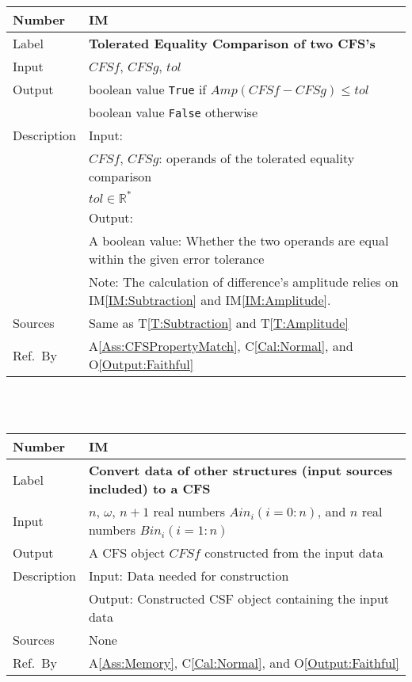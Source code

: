 \documentclass[12pt]{article}
\newcommand{\colAwidth}{0.13\textwidth}
\newcommand{\colBwidth}{0.82\textwidth}
\newcommand{\tref}[1]{T\ref{#1}}
\newcommand{\aref}[1]{A\ref{#1}}
\newcommand{\calref}[1]{C\ref{#1}}
\newcommand{\oref}[1]{O\ref{#1}}
\newcounter{instnum} %
\newcommand{\iref}[1]{IM\ref{#1}}
\begin{document}
\noindent
\begin{minipage}{\textwidth}
       	\renewcommand*{\arraystretch}{1.5}
	\begin{tabular}{| p{\colAwidth} | p{\colBwidth}|}
		\hline
		\rowcolor[gray]{0.9}
		Number& IM{instnum}\theinstnum 
		\label{IM:ToleratedEquality}\\
		\hline
		Label& \bf Tolerated Equality Comparison of two CFS's \\
		\hline
		Input& $\mathit{CFSf}$, $\mathit{CFSg}$, $\mathit{tol}$\\
		\hline
		Output& boolean value \texttt{True} if 
		$\mathit{Amp}(\mathit{CFSf}-\mathit{CFSg})\leq \mathit{tol}$\\
		&boolean value \texttt{False} otherwise\\
		\hline
		Description&Input:\\
		&$\mathit{CFSf}$, $\mathit{CFSg}$: operands of 
		the tolerated equality comparison\\
		&$\mathit{tol}\in\mathbb{R}^{*}$\\
		&Output:\\
		& A boolean value: Whether the two operands are equal 
		within the given error tolerance\\
		&Note: The calculation of difference's amplitude 
		relies on \iref{IM:Subtraction} and \iref{IM:Amplitude}.\\
		\hline
		Sources&Same as \tref{T:Subtraction} and \tref{T:Amplitude}\\
		\hline
		Ref.\ By & \aref{Ass:CFSPropertyMatch}, \calref{Cal:Normal}, 
		and \oref{Output:Faithful}\\
		\hline
	\end{tabular}
\end{minipage}\\
~\newline

\noindent
\begin{minipage}{\textwidth}
	\renewcommand*{\arraystretch}{1.5}
	\begin{tabular}{| p{\colAwidth} | p{\colBwidth}|}
		\hline
		\rowcolor[gray]{0.9}
		Number& IM{instnum}\theinstnum 
		\label{IM:ConvertTo}\\
		\hline
		Label& \bf Convert data of other structures 
		(input sources included) to a CFS \\
		\hline
		Input& $n$, $\omega$, $n+1$ real numbers $\mathit{Ain}_{i} 
		(i=0:n)$, and $n$ real numbers $\mathit{Bin}_{i} (i=1:n)$\\
		\hline
		Output& A CFS object $\mathit{CFSf}$ constructed from 
		the input data\\
		\hline
		Description&Input: Data needed for construction\\
		&Output: Constructed CSF object containing the input data\\
		\hline
		Sources&None		\\
		\hline
		Ref.\ By &  \aref{Ass:Memory}, \calref{Cal:Normal}, 
		and \oref{Output:Faithful}\\
		\hline
	\end{tabular}
\end{minipage}\\
~\newline
\end{document}
